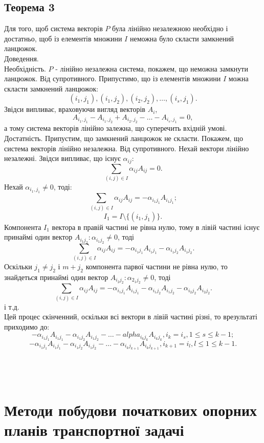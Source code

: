 \documentclass[12pt]{book}
\begin{document}
\subsection{Теорема 3}
Для того, щоб система векторів $P$ була лінійно незалежною необхідно і достатньо, щоб із елементів множини $I$ неможна було скласти замкнений ланцюжок.\\
Доведення.\\
Необхідність. $P$ - лінійно незалежна система, покажем, що неможна замкнути ланцюжок. Від супротивного. Припустимо, що із елементів множини $I$ можна скласти замкнений ланцюжок: $$(i_1,j_1), (i_1,j_2), (i_2,j_2), \dots, (i_s,j_1).$$ Звідси випливає, враховуючи вигляд векторів $A_i$, $$A_{{i_1},{j_1}}-A_{{i_1},{j_2}}+A_{{i_2},{j_2}}-\dots-A_{{i_s},{j_1}}=0,$$ а тому система векторів лінійно залежна, що суперечить вхідній умові.\\
Достатність. Припустим, що замкнений ланцюжок не скласти. Покажем, що система векторів лінійно незалежна. Від супротивного. Нехай вектори лінійно незалежні. Звідси випливає, що існує $\alpha_{ij}:$ $$\sum_{(i,j){\in}I}\alpha_{ij}A_{ij} = 0.$$
Нехай $\alpha_{{i_1},{j_1}} \neq 0$, тоді: $$\sum_{(i,j) \in I}\alpha_{ij}A_{ij} = -\alpha_{{i_1}{j_1}}A_{{i_1}{j_1}};$$$$I_1 = I\setminus\{(i_1,j_1)\}.$$
Компонента $I_1$ вектора в правій частині не рівна нулю, тому в лівій частині існує принаймі один вектор $A_{{i_1}{j_2}}: \alpha_{{i_1}{j_2}}\neq0$, тоді $$\sum_{(i,j){\in}I}\alpha_{ij}A_{ij} = -\alpha_{{i_1}{j_1}}A_{{i_1}{j_1}}-\alpha_{{i_1}{j_2}}A_{{i_1}{j_2}}.$$
Оскільки $j_1 \neq j_2$ і $m + j_2$ компонента парвої частини не рівна нулю, то знайдеться принаймі один вектор $A_{{i_2}{j_2}}: \alpha_{{2_1}{j_2}}\neq0$, тоді $$\sum_{(i,j){\in}I}\alpha_{ij}A_{ij} = -\alpha_{{i_1}{j_1}}A_{{i_1}{j_1}}-\alpha_{{i_1}{j_2}}A_{{i_1}{j_2}}-\alpha_{{i_2}{j_2}}A_{{i_2}{j_2}}.$$
і т.д.\\
Цей процес скінченний, оскільки всі вектори в лівій частині різні, то врезультаті приходимо до: $$-\alpha_{{i_1}{j_1}}A_{{i_1}{j_1}}-\alpha_{{i_1}{j_2}}A_{{i_1}{j_2}}-\dots-alpha_{{i_k}{j_k}}A_{{i_k}{j_k}}, i_k=i_s, 1{\leq}s{\leq}k-1;$$$$- \alpha_{{i_1}{j_1}}A_{{i_1}{j_1}}-\alpha_{{i_1}{j_2}}A_{{i_1}{j_2}}-\dots-\alpha_{{i_k}{j_{k+1}}}A_{{i_k}{j_{k+1}}}, i_{k+1}=i_l, l{\leq}1{\leq}k-1.$$
\\
\\
\\
\section{Методи побудови початкових опорних планів транспортної задачі}
\end{document}
